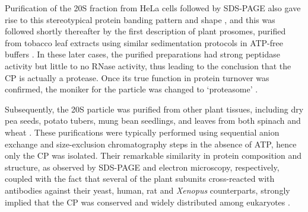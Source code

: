 Purification of the 20S fraction from HeLa cells followed by SDS-PAGE also gave rise to this stereotypical protein banding pattern and shape \citep{schmid84}, and this was followed shortly thereafter by the first description of plant prosomes, purified from tobacco leaf extracts using similar sedimentation protocols in ATP-free buffers \citep{kremp86}.  In these later cases, the purified preparations had strong peptidase activity but little to no RNase activity, thus leading to the conclusion that the CP is actually a protease.  Once its true function in protein turnover was confirmed, the moniker for the particle was changed to ‘proteasome’ \citep{arrigo88}.  
	
	Subsequently, the 20S particle was purified from other plant tissues, including dry pea seeds, potato tubers, mung bean seedlings, and leaves from both spinach and wheat \citep{murray97, ozaki92, schliephacke91, skoda92}.  These purifications were typically performed using sequential anion exchange and size-exclusion chromatography steps in the absence of ATP, hence only the CP was isolated.  Their remarkable similarity in protein composition and structure, as observed by SDS-PAGE and electron microscopy, respectively, coupled with the fact that several of the plant subunits cross-reacted with antibodies against their yeast, human, rat and \textit{Xenopus} counterparts, strongly implied that the CP was conserved and widely distributed among eukaryotes \citep{schliephacke91}.
	
